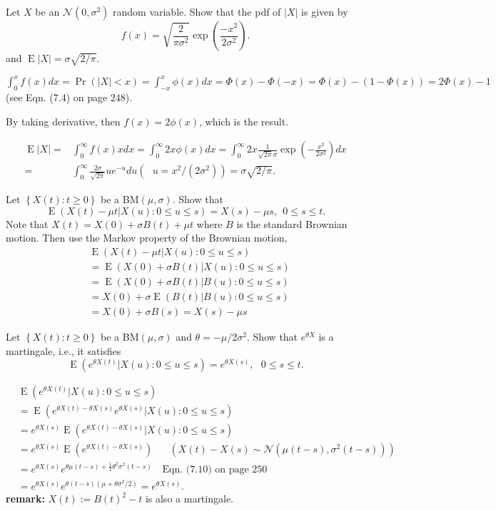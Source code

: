 \documentclass[  11pt]{article}
\newcommand{\p}{ {\Pr}}
\newcommand{\e}{ \operatorname{E}}
\newcommand{\set}[1]{\left\{#1\right\}}
\begin{document}
\begin{ExerciseList}
\Exercise[origin={7.5, 7.6, p 276}]
Let $X$ be an $\mathcal{N}(0,\sigma^2)$ random variable. 
Show that the pdf of $|X|$ is given by 
\[ f(x) = \sqrt{\frac{2}{\pi\sigma^2}}\exp\left( \frac{-x^2}{2\sigma^2}\right).\] 
and $\e |X| = \sigma \sqrt{2/\pi}$.

\Answer
$\int_0^x f(x) dx =\p( |X| < x ) = \int _{-x} ^{x } \phi(x)d x
=\Phi(x) - \Phi(-x) = \Phi(x) - (1-\Phi(x)) =2\Phi(x)-1$ (see Eqn. (7.4) on page 248).

By taking derivative, then
$f(x) = 2\phi(x)$, which is the result.

\[ \begin{split}
\e|X| = &\int_0^\infty f(x)xdx =  \int_0^\infty 2x \phi(x)dx=
 \int_0^\infty  2x \frac{1}{\sqrt{2\pi} \sigma} \exp(-\frac{x^2}{2\sigma^2}) dx
 \\
  = &\int_0^ \infty \frac{2\sigma}{\sqrt{2\pi} }  u e^{-u}du (~~~u=x^2/(2\sigma^2))
  = \sigma \sqrt{2/\pi}.
  \end{split}
 \]

\Exercise[origin={7.20, p 277}]
Let $\set{X(t): t\geq 0}$ be a BM$(\mu,\sigma)$. Show that  
\[\e( X(t)-\mu t \vert X(u): 0\leq u \leq s ) = X(s) -\mu s , ~~0\leq s \leq t.
\] 
\Answer  Note that 
$X(t)=X(0)+\sigma B(t) + \mu t$
where $B$ is the standard Brownian motion.
Then use the Markov property of the Brownian motion,
 \[
 \begin{split}
& \e( X(t)-\mu t \vert X(u): 0\leq u \leq s )  \\
 &=\e( X(0) + \sigma B(t) \vert X(u): 0\leq u \leq s )\\
 &=\e( X(0) + \sigma B(t) \vert B(u): 0\leq u \leq s )\\
 &= X(0) +  \sigma  \e (B(t) \vert B(u): 0\leq u \leq s )\\
 &= X(0) +  \sigma    B(s) = X(s)-\mu s
  \end{split}
\]

\Exercise [origin={7.21, p 277}]
Let $\set{X(t): t\geq 0}$ be a BM$(\mu,\sigma)$ and $\theta=-\mu/2\sigma^2$. Show that  
$e^{\theta X}$ is a martingale, i.e., it satisfies 
\[ \e (e^{\theta X(t)} \vert X(u) : 0\leq u \leq  s) = e^{\theta X(s)}, ~~~0\leq s \leq t.\] 

\Answer 
\[\begin{split}
 &\e (e^{\theta X(t)} \vert X(u) : 0\leq u \leq s) \\
 &=\e (e^{\theta X(t)- \theta X(s)} e^{\theta X(s)} \vert X(u) : 0\leq u \leq s )  
 \\
 &=e^{\theta X(s)}\e (e^{\theta X(t)- \theta X(s)}  \vert X(u) : 0\leq u \leq s )  
\\
 &=e^{\theta X(s)}\e (e^{\theta X(t)- \theta X(s)})   ~\quad~~ (X(t)-X(s) \sim \mathcal{N}(\mu(t-s),\sigma^2 (t-s))) \\
 &=e^{\theta X(s)}  e^{\theta \mu(t-s) +\frac12 \theta^2 \sigma^2 (t-s)}  ~~~ \mbox{ Eqn. (7.10) on page 250}\\
 & = e^{\theta X(s)}  e^{\theta  (t-s)  (\mu + \theta \sigma^2/2 )}= e^{\theta X(s)}.
 \end{split}
 \] 
{\bf remark: } $X(t):=B(t)^2 -t $ is also a martingale.


\end{ExerciseList}
\end{document}
